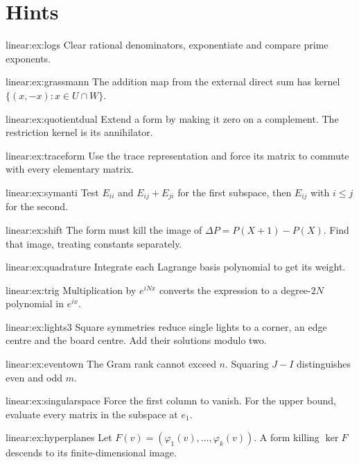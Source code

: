 \section{Hints}
\begin{hint}{linear:ex:logs}
Clear rational denominators, exponentiate and compare prime exponents.
\end{hint}
\begin{hint}{linear:ex:grassmann}
The addition map from the external direct sum has kernel $\{(x,-x):x\in U\cap W\}$.
\end{hint}
\begin{hint}{linear:ex:quotientdual}
Extend a form by making it zero on a complement. The restriction kernel is its annihilator.
\end{hint}
\begin{hint}{linear:ex:traceform}
Use the trace representation and force its matrix to commute with every elementary matrix.
\end{hint}
\begin{hint}{linear:ex:symanti}
Test $E_{ii}$ and $E_{ij}+E_{ji}$ for the first subspace, then $E_{ij}$ with $i\le j$ for the second.
\end{hint}
\begin{hint}{linear:ex:shift}
The form must kill the image of $\Delta P=P(X+1)-P(X)$. Find that image, treating constants separately.
\end{hint}
\begin{hint}{linear:ex:quadrature}
Integrate each Lagrange basis polynomial to get its weight.
\end{hint}
\begin{hint}{linear:ex:trig}
Multiplication by $e^{iNx}$ converts the expression to a degree-$2N$ polynomial in $e^{ix}$.
\end{hint}
\begin{hint}{linear:ex:lights3}
Square symmetries reduce single lights to a corner, an edge centre and the board centre. Add their solutions modulo two.
\end{hint}
\begin{hint}{linear:ex:eventown}
The Gram rank cannot exceed $n$. Squaring $J-I$ distinguishes even and odd $m$.
\end{hint}
\begin{hint}{linear:ex:singularspace}
Force the first column to vanish. For the upper bound, evaluate every matrix in the subspace at $e_1$.
\end{hint}
\begin{hint}{linear:ex:hyperplanes}
Let $F(v)=(\varphi_1(v),\ldots,\varphi_k(v))$. A form killing $\ker F$ descends to its finite-dimensional image.
\end{hint}

